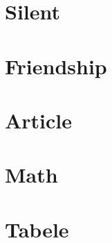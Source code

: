 \documentclass[12pt]{report}
\begin{document}
    

    \tableofcontents
    \listoftables
    \listoffigures

    \chapter{Silent}
    

    \chapter{Friendship}
    

    \chapter{Article}
    

    \chapter{Math}
    

    \chapter{Tabele}
    

    
\end{document}
